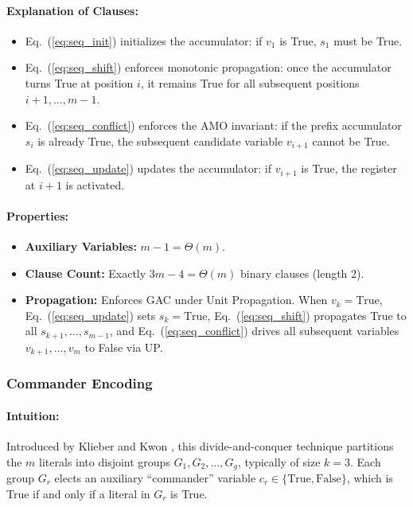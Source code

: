 \documentclass[a4paper,fleqn]{cas-sc}
\begin{document}
\paragraph{Explanation of Clauses:}
\begin{itemize}
    \item Eq.~(\ref{eq:seq_init}) initializes the accumulator: if $v_1$ is True, $s_1$ must be True.
    \item Eq.~(\ref{eq:seq_shift}) enforces monotonic propagation: once the accumulator turns True at position $i$, it remains True for all subsequent positions $i+1, \dots, m-1$.
    \item Eq.~(\ref{eq:seq_conflict}) enforces the AMO invariant: if the prefix accumulator $s_i$ is already True, the subsequent candidate variable $v_{i+1}$ cannot be True.
    \item Eq.~(\ref{eq:seq_update}) updates the accumulator: if $v_{i+1}$ is True, the register at $i+1$ is activated.
\end{itemize}
\paragraph{Properties:}
\begin{itemize}
    \item \textbf{Auxiliary Variables:} $m - 1 = \Theta(m)$.
    \item \textbf{Clause Count:} Exactly $3m - 4 = \Theta(m)$ binary clauses (length 2).
    \item \textbf{Propagation:} Enforces GAC under Unit Propagation. When $v_k = \text{True}$, Eq.~(\ref{eq:seq_update}) sets $s_k = \text{True}$, Eq.~(\ref{eq:seq_shift}) propagates True to all $s_{k+1}, \dots, s_{m-1}$, and Eq.~(\ref{eq:seq_conflict}) drives all subsequent variables $v_{k+1}, \dots, v_m$ to False via UP.
\end{itemize}

\subsubsection{Commander Encoding}
\paragraph{Intuition:} Introduced by Klieber and Kwon \cite{klieber2007commander}, this divide-and-conquer technique partitions the $m$ literals into disjoint groups $G_1, G_2, \dots, G_g$, typically of size $k = 3$. Each group $G_r$ elects an auxiliary ``commander'' variable $c_r \in \{\text{True}, \text{False}\}$, which is True if and only if a literal in $G_r$ is True.
\end{document}
